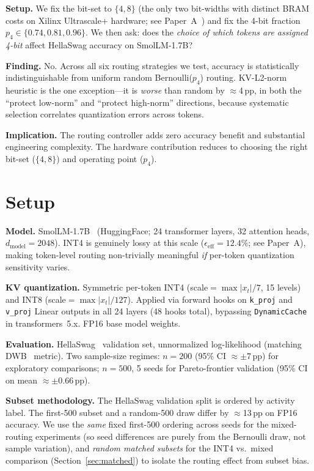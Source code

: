 \documentclass{article}
\begin{document}
\textbf{Setup.} We fix the bit-set to $\{4,8\}$ (the only two bit-widths with distinct BRAM
costs on Xilinx Ultrascale+ hardware; see Paper~A~\citep{companion_paper_a}) and fix the
4-bit fraction $p_4 \in \{0.74, 0.81, 0.96\}$. We then ask: does the \emph{choice of which
tokens are assigned 4-bit} affect HellaSwag accuracy on SmolLM-1.7B?

\textbf{Finding.} No. Across all six routing strategies we test, accuracy is statistically
indistinguishable from uniform random Bernoulli($p_4$) routing.
KV-L2-norm heuristic is the one exception---it is \emph{worse} than random by $\approx$4\,pp,
in both the ``protect low-norm'' and ``protect high-norm'' directions, because systematic
selection correlates quantization errors across tokens.

\textbf{Implication.} The routing controller adds zero accuracy benefit and substantial
engineering complexity. The hardware contribution reduces to choosing the right bit-set
($\{4,8\}$) and operating point ($p_4$).

\section{Setup}
\label{sec:setup}

\textbf{Model.} SmolLM-1.7B~\citep{smollm} (HuggingFace; 24 transformer layers, 32 attention
heads, $d_\text{model}=2048$). INT4 is genuinely lossy at this scale ($\epsilon_\text{eff}=12.4\%$;
see Paper~A), making token-level routing non-trivially meaningful \emph{if} per-token
quantization sensitivity varies.

\textbf{KV quantization.} Symmetric per-token INT4 (scale$=\max|x_t|/7$, 15 levels) and INT8
(scale$=\max|x_t|/127$). Applied via forward hooks on \texttt{k\_proj} and \texttt{v\_proj}
Linear outputs in all 24 layers (48 hooks total), bypassing \texttt{DynamicCache} in
transformers~5.x. FP16 base model weights.

\textbf{Evaluation.} HellaSwag~\citep{zellers2019hellaswag} validation set, unnormalized
log-likelihood (matching DWB~\citep{haeri2026dwb} metric). Two sample-size regimes: $n{=}200$
(95\% CI $\approx\pm7$\,pp) for exploratory comparisons; $n{=}500$, 5 seeds for
Pareto-frontier validation (95\% CI on mean $\approx\pm0.66$\,pp).

\textbf{Subset methodology.} The HellaSwag validation split is ordered by activity label.
The first-500 subset and a random-500 draw differ by $\approx$13\,pp on FP16 accuracy.
We use the \emph{same} fixed first-500 ordering across seeds for the mixed-routing
experiments (so seed differences are purely from the Bernoulli draw, not sample
variation), and \emph{random matched subsets} for the INT4 vs.\ mixed comparison
(Section~\ref{sec:matched}) to isolate the routing effect from subset bias.
\end{document}
